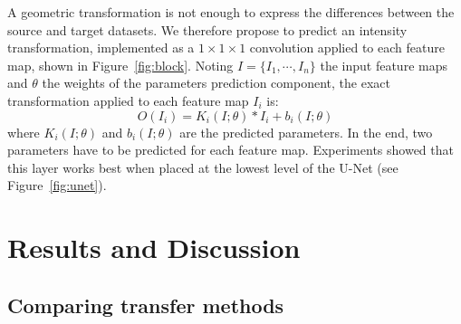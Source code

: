 A geometric transformation is not enough to express the differences between the source and target datasets. We therefore propose to predict an intensity transformation, implemented as a $1 \times 1 \times 1$ convolution applied to each feature map, shown in Figure~\ref{fig:block}. Noting $I = \{ I_1, \cdots, I_n \}$ the input feature maps and $\theta$ the weights of the parameters prediction component, the exact transformation applied to each feature map $I_i$ is:
\begin{equation*}
O \left( I_i \right) = K_i \left( I; \theta \right) * I_i + b_i \left( I; \theta \right)
\end{equation*}
where $K_i \left( I; \theta \right)$ and $b_i \left( I; \theta \right)$ are the predicted parameters. In the end, two parameters have to be predicted for each feature map. Experiments showed that this layer works best when placed at the lowest level of the U-Net (see Figure~\ref{fig:unet}).

\section{Results and Discussion}
\label{sec:kidney_res}

\subsection{Comparing transfer methods}

